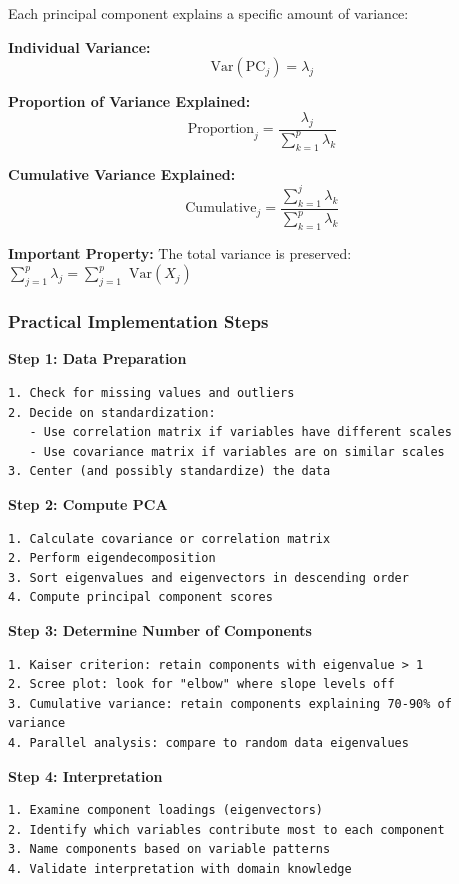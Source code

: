 \documentclass[
]{article}
\begin{document}
Each principal component explains a specific amount of variance:

\textbf{Individual Variance:}
\[\text{ Var}\left( \text{PC}_{j} \right) = \lambda_{j}\]

\textbf{Proportion of Variance Explained:}
\[\text{ Proportion}_{j} = \frac{\lambda_{j}}{\sum_{k = 1}^{p}\lambda_{k}}\]

\textbf{Cumulative Variance Explained:}
\[\text{ Cumulative}_{j} = \frac{\sum_{k = 1}^{j}\lambda_{k}}{\sum_{k = 1}^{p}\lambda_{k}}\]

\textbf{Important Property:} The total variance is preserved:
\(\sum_{j = 1}^{p}\lambda_{j} = \sum_{j = 1}^{p}\text{ Var}\left( X_{j} \right)\)

\subsubsection{Practical Implementation Steps}

\textbf{Step 1: Data Preparation}

\begin{verbatim}
1. Check for missing values and outliers
2. Decide on standardization:
   - Use correlation matrix if variables have different scales
   - Use covariance matrix if variables are on similar scales
3. Center (and possibly standardize) the data
\end{verbatim}

\textbf{Step 2: Compute PCA}

\begin{verbatim}
1. Calculate covariance or correlation matrix
2. Perform eigendecomposition
3. Sort eigenvalues and eigenvectors in descending order
4. Compute principal component scores
\end{verbatim}

\textbf{Step 3: Determine Number of Components}

\begin{verbatim}
1. Kaiser criterion: retain components with eigenvalue > 1
2. Scree plot: look for "elbow" where slope levels off
3. Cumulative variance: retain components explaining 70-90% of variance
4. Parallel analysis: compare to random data eigenvalues
\end{verbatim}

\textbf{Step 4: Interpretation}

\begin{verbatim}
1. Examine component loadings (eigenvectors)
2. Identify which variables contribute most to each component
3. Name components based on variable patterns
4. Validate interpretation with domain knowledge
\end{verbatim}
\end{document}
